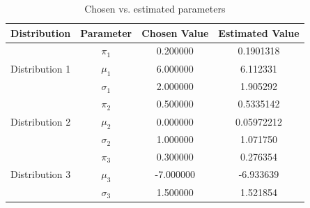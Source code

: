 \documentclass[]{article}
\begin{document}
\begin{table}[H]
	\centering
	\renewcommand{\arraystretch}{1.2}
	\begin{tabular}{|c|c|c|c|}
		\hline
		Distribution & Parameter & Chosen Value & Estimated Value \\
		\hline
		\multirow{3}{*}{Distribution 1} & $\pi_1$ & 0.200000 & 0.1901318 \\
		& $\mu_1$ & 6.000000 & 6.112331 \\
		& $\sigma_1$ & 2.000000 & 1.905292 \\
		\hline
		\multirow{3}{*}{Distribution 2} & $\pi_2$ & 0.500000 & 0.5335142 \\
		& $\mu_2$ & 0.000000 & 0.05972212 \\
		& $\sigma_2$ & 1.000000 & 1.071750 \\
		\hline
		\multirow{3}{*}{Distribution 3} & $\pi_3$ & 0.300000 & 0.276354 \\
		& $\mu_3$ & -7.000000 & -6.933639 \\
		& $\sigma_3$ & 1.500000 & 1.521854 \\
		\hline
	\end{tabular}
	\caption{Chosen vs. estimated parameters}
	\label{tab:gmm_chosen_vs_estimated_full}
\end{table}





\end{document}
